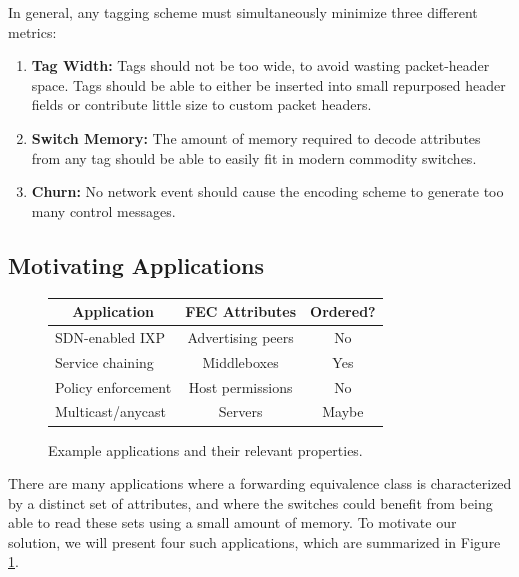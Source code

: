 In general, any tagging scheme must simultaneously minimize three different
metrics: \begin{enumerate} \item \textbf{Tag Width:} Tags should not be too
wide, to avoid wasting packet-header space.  Tags should be able to either be
inserted into small repurposed header fields or contribute little size to custom
packet headers.  \item \textbf{Switch Memory:} The amount of memory required to
decode attributes from any tag should be able to easily fit in modern commodity
switches.  \item \textbf{Churn:} No network event should cause the encoding
scheme to generate too many control messages.  \end{enumerate}


\subsection{Motivating Applications} \begin{figure} \small \begin{center}
\begin{tabular}{|l|c|c|} \hline \multicolumn{1}{|c|}{\bf Application} &
\multicolumn{1}{c|}{\bf FEC Attributes} & \multicolumn{1}{c|}{\bf Ordered?}\\
\hline SDN-enabled IXP & Advertising peers & No \\ \hline Service chaining &
Middleboxes & Yes \\ \hline Policy enforcement & Host permissions & No \\ \hline
Multicast/anycast & Servers & Maybe \\ \hline \end{tabular} \end{center}
\caption{Example applications and their relevant properties. }
\label{tab:applications} \end{figure}

There are many applications where a forwarding equivalence class is
characterized by a distinct set of attributes, and where the switches could
benefit from being able to read these sets using a small amount of memory. To
motivate our solution, we will present four such applications, which are
summarized in Figure \ref{tab:applications}.
 
